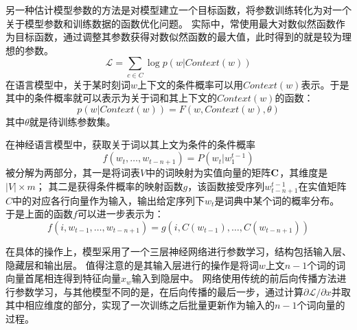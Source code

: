 另一种估计模型参数的方法是对模型建立一个目标函数，将参数训练转化为对一个关于模型参数和训练数据的函数优化问题。
实际中，常使用最大对数似然函数作为目标函数，通过调整其参数获得对数似然函数的最大值，此时得到的就是较为理想的参数。
\begin{equation}
    \mathcal{L} = \sum_{c\in C} \log p(w|Context(w))
\end{equation}
在语言模型中，关于某时刻词$w$上下文的条件概率可以用$Context(w)$表示。于是其中的条件概率就可以表示为关于词和其上下文的$Context(w)$的函数：
\begin{equation}
    p(w|Context(w)) = F(w, Context(w), \theta)
\end{equation}
其中$\theta$就是待训练参数集。

在神经语言模型中，获取关于词以其上文为条件的条件概率
\begin{equation}
    f(w_t, \dots, w_{t-n+1}) = P(w_t|w_1^{t-1})
\end{equation}
被分解为两部分，其一是将词表$V$中的词映射为实值向量的矩阵$\boldsymbol{\mathbf{C}}$，其维度是$|V|\times m$；
其二是获得条件概率的映射函数$g$，该函数接受序列$w_{t-n+1}^{t-1}$在实值矩阵$C$中的对应各行向量作为输入，输出给定序列下$w_t$是词典中某个词的概率分布。
于是上面的函数$f$可以进一步表示为：
\begin{equation}
    f(i, w_{t-1}, \dots, w_{t-n+1}) = g(i, C(w_{t-1}), \dots, C(w_{t-n+1}))
\end{equation}

在具体的操作上，模型采用了一个三层神经网络进行参数学习，结构包括输入层、隐藏层和输出层。
值得注意的是其输入层进行的操作是将词$w$上文$n-1$个词的词向量首尾相连得到特征向量$x_w$输入到隐层中。
网络使用传统的前后向传播方法进行参数学习，与其他模型不同的是，在后向传播的最后一步，通过计算${\partial\mathcal{L}}/{\partial x}$并取其中相应维度的部分，实现了一次训练之后批量更新作为输入的$n-1$个词向量的过程。

